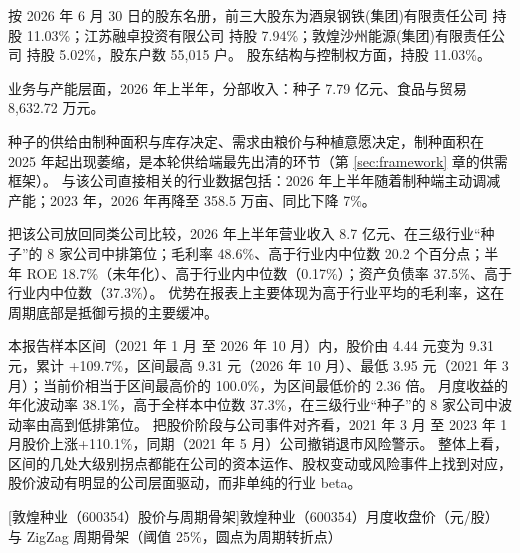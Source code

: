  按 2026 年 6 月 30 日的股东名册，前三大股东为酒泉钢铁(集团)有限责任公司 持股 11.03\%；江苏融卓投资有限公司 持股 7.94\%；敦煌沙州能源(集团)有限责任公司 持股 5.02\%，股东户数 55,015 户。 股东结构与控制权方面，持股 11.03\%。

 业务与产能层面，2026 年上半年，分部收入：种子 7.79 亿元、食品与贸易 8,632.72 万元。

 种子的供给由制种面积与库存决定、需求由粮价与种植意愿决定，制种面积在 2025 年起出现萎缩，是本轮供给端最先出清的环节（第 \ref{sec:framework} 章的供需框架）。 与该公司直接相关的行业数据包括：2026 年上半年随着制种端主动调减产能；2023 年，2026 年再降至 358.5 万亩、同比下降 7\%。

 把该公司放回同类公司比较，2026 年上半年营业收入 8.7 亿元、在三级行业“种子”的 8 家公司中排第位；毛利率 48.6\%、高于行业内中位数 20.2 个百分点；半年 ROE 18.7\%（未年化）、高于行业内中位数（0.17\%）；资产负债率 37.5\%、高于行业内中位数（37.3\%）。 优势在报表上主要体现为高于行业平均的毛利率，这在周期底部是抵御亏损的主要缓冲。

 本报告样本区间（2021 年 1 月 至 2026 年 10 月）内，股价由 4.44 元变为 9.31 元，累计 +109.7\%，区间最高 9.31 元（2026 年 10 月）、最低 3.95 元（2021 年 3 月）；当前价相当于区间最高价的 100.0\%，为区间最低价的 2.36 倍。 月度收益的年化波动率 38.1\%，高于全样本中位数 37.3\%，在三级行业“种子”的 8 家公司中波动率由高到低排第位。 把股价阶段与公司事件对齐看，2021 年 3 月 至 2023 年 1 月股价上涨+110.1\%，同期（2021 年 5 月）公司撤销退市风险警示。 整体上看，区间的几处大级别拐点都能在公司的资本运作、股权变动或风险事件上找到对应，股价波动有明显的公司层面驱动，而非单纯的行业 beta。

\begin{center}
\begin{minipage}{\textwidth}\centering
{}

[敦煌种业（600354）股价与周期骨架]{敦煌种业（600354）月度收盘价（元/股）与 ZigZag 周期骨架（阈值 25\%，圆点为周期转折点）}
\end{minipage}
\end{center}

